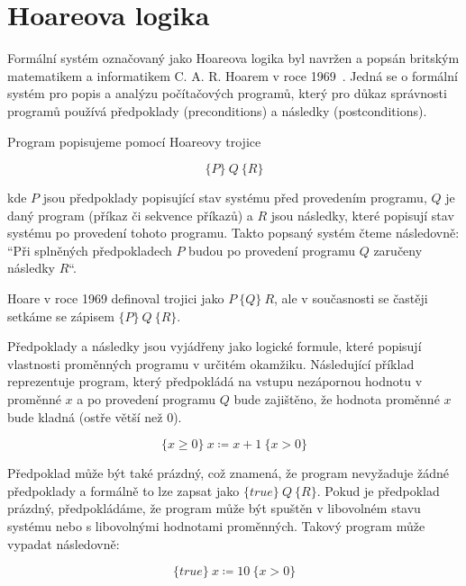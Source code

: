 \chapter{Hoareova logika}
\label{ch:hoareova-logika}

Formální systém označovaný jako Hoareova logika byl navržen a popsán
britským matematikem a informatikem C. A. R. Hoarem v roce 1969~\cite{Hoare1969}.
Jedná se o formální systém pro popis a analýzu počítačových programů,
který pro důkaz správnosti programů používá předpoklady (preconditions) a následky (postconditions).

Program popisujeme pomocí Hoareovy trojice

\begin{equation*}
    \{P\} \  Q \  \{R\}
\end{equation*}

kde $P$ jsou předpoklady popisující stav systému před provedením programu,
$Q$ je daný program (příkaz či sekvence příkazů)
a $R$ jsou následky, které popisují stav systému po provedení tohoto programu.
Takto popsaný systém čteme následovně:
``Při splněných předpokladech $P$ budou po provedení programu $Q$ zaručeny následky $R$``.

Hoare v roce 1969 definoval trojici jako $P \ \{ Q \} \  R$,
ale v současnosti se častěji setkáme se zápisem $\{ P \} \  Q \ \{ R \}$.

Předpoklady a následky jsou vyjádřeny jako logické formule,
které popisují vlastnosti proměnných programu v určitém okamžiku.
Následující příklad reprezentuje program, který předpokládá na vstupu nezápornou hodnotu v proměnné $x$
a po provedení programu $Q$ bude zajištěno, že hodnota proměnné $x$ bude kladná (ostře větší než 0).

\begin{equation*}
    \{ x \geq 0 \} \  x \coloneqq x + 1 \  \{ x > 0 \}
\end{equation*}

Předpoklad může být také prázdný, což znamená, že program nevyžaduje žádné předpoklady
a formálně to lze zapsat jako $\{ true \} \  Q \  \{ R \}$.
Pokud je předpoklad prázdný, předpokládáme, že program může být spuštěn
v libovolném stavu systému nebo s libovolnými hodnotami proměnných.
Takový program může vypadat následovně:

\begin{equation*}
    \{ true \} \  x \coloneqq 10 \  \{ x > 0 \}
\end{equation*}


